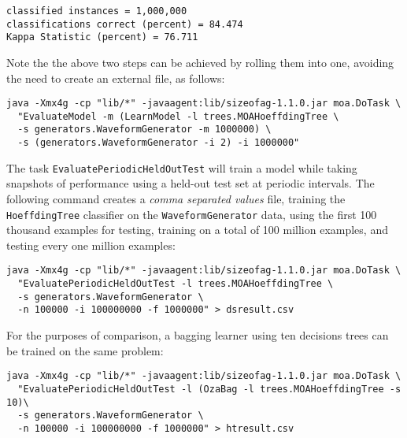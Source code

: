 \documentclass[a4paper,12pt,twoside]{book}
\begin{document}
\begin{footnotesize}\begin{verbatim}
classified instances = 1,000,000
classifications correct (percent) = 84.474
Kappa Statistic (percent) = 76.711
\end{verbatim}\end{footnotesize}

Note the the above two steps can be achieved by rolling them into one, avoiding the need to create an external file, as follows:

\begin{footnotesize}\begin{verbatim}
java -Xmx4g -cp "lib/*" -javaagent:lib/sizeofag-1.1.0.jar moa.DoTask \
  "EvaluateModel -m (LearnModel -l trees.MOAHoeffdingTree \
  -s generators.WaveformGenerator -m 1000000) \
  -s (generators.WaveformGenerator -i 2) -i 1000000"
\end{verbatim}\end{footnotesize}

The task \verb+EvaluatePeriodicHeldOutTest+ will train a model while taking snapshots of performance using a held-out test set at periodic intervals.
The following command creates a {\em comma separated values} file, training the \verb+HoeffdingTree+ classifier on the \verb+WaveformGenerator+ data, using the first 100 thousand examples for testing, training on a total of 100 million examples, and testing every one million examples:

\begin{footnotesize}\begin{verbatim}
java -Xmx4g -cp "lib/*" -javaagent:lib/sizeofag-1.1.0.jar moa.DoTask \
  "EvaluatePeriodicHeldOutTest -l trees.MOAHoeffdingTree \
  -s generators.WaveformGenerator \
  -n 100000 -i 100000000 -f 1000000" > dsresult.csv
\end{verbatim}\end{footnotesize}

  For the purposes of comparison, a bagging learner using ten decisions trees can be trained on
the same problem:
\begin{footnotesize}\begin{verbatim}
java -Xmx4g -cp "lib/*" -javaagent:lib/sizeofag-1.1.0.jar moa.DoTask \
  "EvaluatePeriodicHeldOutTest -l (OzaBag -l trees.MOAHoeffdingTree -s 10)\
  -s generators.WaveformGenerator \
  -n 100000 -i 100000000 -f 1000000" > htresult.csv
\end{verbatim}\end{footnotesize}
\end{document}
